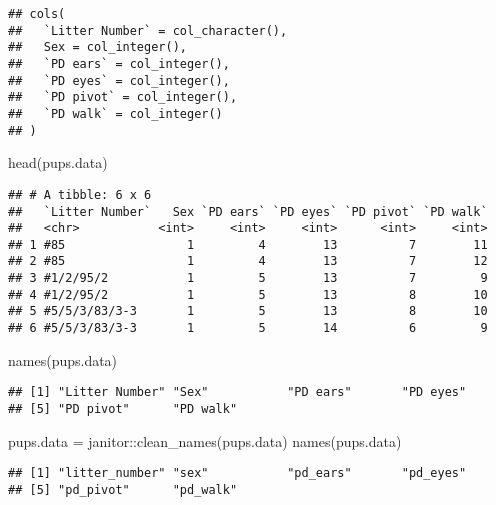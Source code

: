 \documentclass[
]{article}
\newenvironment{Shaded}{\begin{snugshade}}{\end{snugshade}}
\newcommand{\FunctionTok}[1]{\textcolor[rgb]{0.00,0.00,0.00}{#1}}
\newcommand{\NormalTok}[1]{#1}
\newcommand{\OtherTok}[1]{\textcolor[rgb]{0.56,0.35,0.01}{#1}}
\newcommand{\SpecialCharTok}[1]{\textcolor[rgb]{0.00,0.00,0.00}{#1}}
\begin{document}
\begin{verbatim}
## cols(
##   `Litter Number` = col_character(),
##   Sex = col_integer(),
##   `PD ears` = col_integer(),
##   `PD eyes` = col_integer(),
##   `PD pivot` = col_integer(),
##   `PD walk` = col_integer()
## )
\end{verbatim}

\begin{Shaded}
\begin{Highlighting}[]
\FunctionTok{head}\NormalTok{(pups.data)}
\end{Highlighting}
\end{Shaded}

\begin{verbatim}
## # A tibble: 6 x 6
##   `Litter Number`   Sex `PD ears` `PD eyes` `PD pivot` `PD walk`
##   <chr>           <int>     <int>     <int>      <int>     <int>
## 1 #85                 1         4        13          7        11
## 2 #85                 1         4        13          7        12
## 3 #1/2/95/2           1         5        13          7         9
## 4 #1/2/95/2           1         5        13          8        10
## 5 #5/5/3/83/3-3       1         5        13          8        10
## 6 #5/5/3/83/3-3       1         5        14          6         9
\end{verbatim}

\begin{Shaded}
\begin{Highlighting}[]
\FunctionTok{names}\NormalTok{(pups.data)}
\end{Highlighting}
\end{Shaded}

\begin{verbatim}
## [1] "Litter Number" "Sex"           "PD ears"       "PD eyes"      
## [5] "PD pivot"      "PD walk"
\end{verbatim}

\begin{Shaded}
\begin{Highlighting}[]
\NormalTok{pups.data }\OtherTok{=}\NormalTok{ janitor}\SpecialCharTok{::}\FunctionTok{clean\_names}\NormalTok{(pups.data)}
\FunctionTok{names}\NormalTok{(pups.data)}
\end{Highlighting}
\end{Shaded}

\begin{verbatim}
## [1] "litter_number" "sex"           "pd_ears"       "pd_eyes"      
## [5] "pd_pivot"      "pd_walk"
\end{verbatim}
\end{document}
